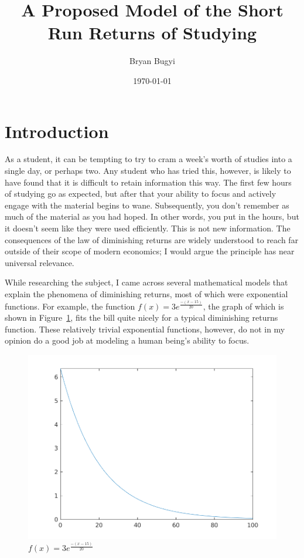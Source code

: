 \documentclass[12pt]{article}
\title{A Proposed Model of the Short Run Returns of Studying}
\author{Bryan Bugyi}
\date{\today}
\begin{document}
    \maketitle

    \begin{abstract}
        \lipsum[1]
    \end{abstract}

    \section{Introduction}
    As a student, it can be tempting to try to cram a week's worth of studies into a single day, or perhaps two. Any student who has tried this, however, is likely to have found that it is difficult to retain information this way. The first few hours of studying go as expected, but after that your ability to focus and actively engage with the material begins to wane. Subsequently, you don't remember as much of the material as you had hoped. In other words, you put in the hours, but it doesn't seem like they were used efficiently. This is not new information. The consequences of the law of diminishing returns are widely understood to reach far outside of their scope of modern economics; I would argue the principle has near universal relevance.
    
    While researching the subject, I came across several mathematical models that explain the phenomena of diminishing returns, most of which were exponential functions. For example, the function $f(x) = 3e^{\frac{-(x-15)}{20}}$, the graph of which is shown in Figure~\ref{Fig:Triv}, fits the bill quite nicely for a typical diminishing returns function. These relatively trivial exponential functions, however, do not in my opinion do a good job at modeling a human being's ability to focus.
    

    \begin{figure}[Htb]
        \begin{center}
            \caption{$f(x) = 3e^{\frac{-(x-15)}{20}}$} \label{Fig:Triv}
            \includegraphics[scale=.5]{TrivialDimReturns.png}
        \end{center}
    \end{figure}
\end{document}
